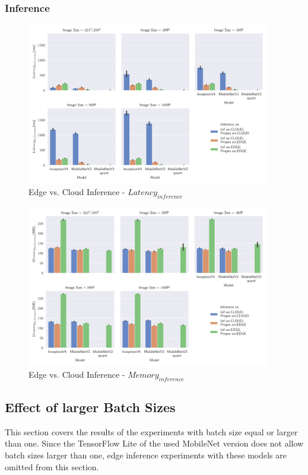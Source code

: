 \subsubsection{Inference}
\begin{figure}[H]
\centering
\includegraphics[width=0.95\textwidth]{./Bilder/single_plots/edge_vs_cloud_plots/Edge_vs_Cloud_Inference_Inference_Latencies.pdf}
\caption{Edge vs. Cloud Inference -  $Latency_{inference}$}
\label{fig:EdgeVsCloudInferenceLat}
\end{figure}
\begin{figure}[H]
\centering
\includegraphics[width=0.95\textwidth]{./Bilder/single_plots/edge_vs_cloud_plots/Edge_vs_Cloud_Inference_Inference_Memory.pdf}
\caption{Edge vs. Cloud Inference -  $Memory_{inference}$}
\label{fig:EdgeVsCloudInferenceMemory}
\end{figure}
\subsection{Effect of larger Batch Sizes}
This section covers the results of the experiments with batch size equal or larger than one. Since the TensorFlow Lite of the used MobileNet version does not allow batch sizes larger than one, edge inference experiments with these models are omitted from this section.
